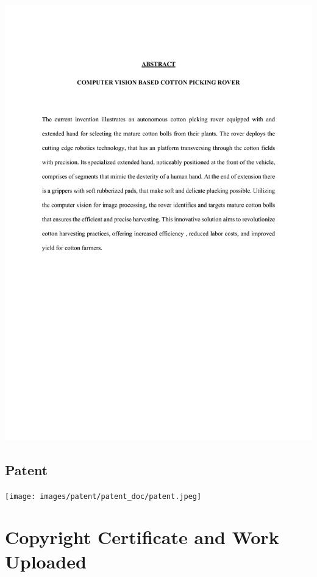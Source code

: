 \documentclass[12pt,a4paper]{report}
\begin{document}
\includegraphics[scale =0.7]{images/patent/patent_doc/output-0007.jpg}


\subsection {Patent}
\texttt{[image: images/patent/patent\_doc/patent.jpeg]}

\newpage
\section {Copyright Certificate and Work Uploaded}
\end{document}
